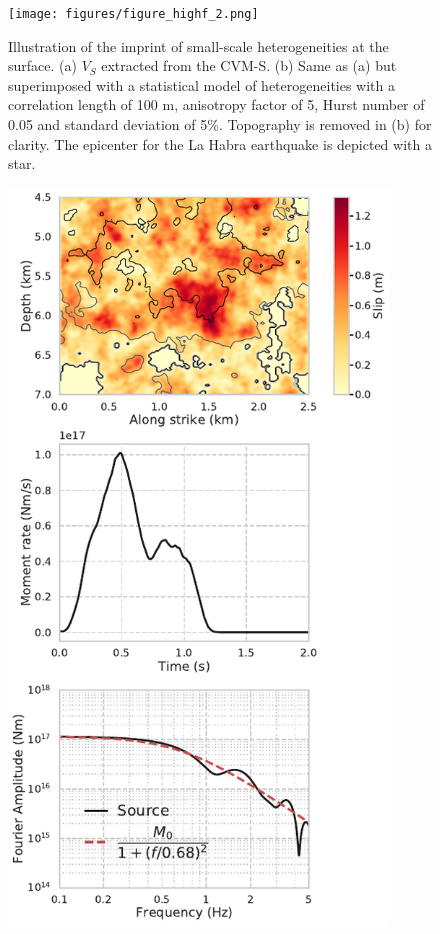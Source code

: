 \begin{figure}[!ht]
  \centering
  \texttt{[image: figures/figure\_highf\_2.png]}
  \caption{Illustration of the imprint of small-scale heterogeneities at the surface. (a) $V_S$ extracted from the CVM-S. (b) Same as (a) but superimposed with a statistical model of heterogeneities with a correlation length of 100 m, anisotropy factor of 5, Hurst number of 0.05 and standard deviation of 5\%. Topography is removed in (b) for clarity. The epicenter for the La Habra earthquake is depicted with a star.}
  \label{fig:highf-2}
\end{figure}
\clearpage

\begin{figure}[!ht]
  \centering
  \includegraphics[width=0.9\textwidth,height=0.85\textheight,keepaspectratio]{figures/figure_highf_3.pdf}

\end{figure}
